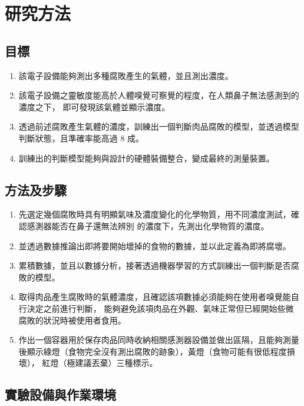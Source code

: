 \chapter{研究方法}

\section{目標}
\begin{enumerate}
	\item 該電子設備能夠測出多種腐敗產生的氣體，並且測出濃度。
	\item 該電子設備之靈敏度能高於人體嗅覺可察覺的程度，在人類鼻子無法感測到的濃度之下，
		即可發現該氣體並顯示濃度。
	\item 透過前述腐敗產生氣體的濃度，訓練出一個判斷肉品腐敗的模型，並透過模型判斷狀態，且準確率能高過 8 成。 
	\item 訓練出的判斷模型能夠與設計的硬體裝備整合，變成最終的測量裝置。
\end{enumerate}

\section{方法及步驟}
\begin{enumerate}
	\item 先選定幾個腐敗時具有明顯氣味及濃度變化的化學物質，用不同濃度測試，確認感測器能否在鼻子還無法辨別
		的濃度下，先測出化學物質的濃度。
	\item 並透過數據推論出即將要開始壞掉的食物的數據，並以此定義為即將腐壞。 
	\item 累積數據，並且以數據分析，接著透過機器學習的方式訓練出一個判斷是否腐敗的模型。
	\item 取得肉品產生腐敗時的氣體濃度，且確認該項數據必須能夠在使用者嗅覺能自行決定之前進行判斷，
		能夠避免該項肉品在外觀、氣味正常但已經開始些微腐敗的狀況時被使用者食用。
	\item 作出一個容器用於保存肉品同時收納相關感測器設備並做出區隔，且能夠測量後顯示綠燈（食物完全沒有測出腐敗的跡象），黃燈（食物可能有很低程度損壞），
		紅燈（極建議丟棄）三種標示。 
\end{enumerate}

\section{實驗設備與作業環境}
